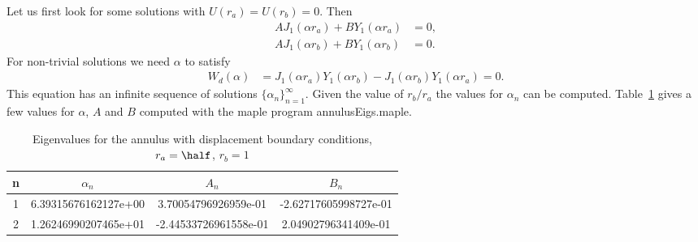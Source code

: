 Let us first look for some solutions with $U(r_a)=U(r_b)=0$. 
Then
\begin{align*}
   A J_1(\alpha r_a) + B Y_1(\alpha r_a) &= 0 , \\
   A J_1(\alpha r_b) + B Y_1(\alpha r_b) &= 0 . 
\end{align*}
For non-trivial solutions we need $\alpha$ to satisfy 
\begin{align*}
   W_d(\alpha) &= J_1(\alpha r_a)Y_1(\alpha r_b) - J_1(\alpha r_b) Y_1(\alpha r_a) =0. 
\end{align*}
This equation has an infinite sequence of solutions $\{ \alpha_n \}_{n=1}^\infty$. Given the value of 
$r_b/r_a$ the values for $\alpha_n$ can be computed. 
Table~\ref{tab:annulusEigDisplacement} gives a few values
for $\alpha$, $A$ and $B$ computed with the maple program annulusEigs.maple. 
%
\begin{table}[hbt]
\begin{center}
\begin{tabular}{|c|c|c|c|} \hline
n & $\alpha_n$  & $A_n$ & $B_n$ \\ \hline 
1 & 6.39315676162127e+00 & 3.70054796926959e-01  & -2.62717605998727e-01 \\
2 & 1.26246990207465e+01 & -2.44533726961558e-01 & 2.04902796341409e-01 \\
\hline
\end{tabular}
\caption{Eigenvalues for the annulus with displacement boundary conditions, $r_a=\half$, $r_b=1$}\label{tab:annulusEigDisplacement}
\end{center}
\end{table}

